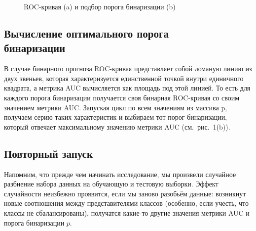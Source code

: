 \begin{figure}[!htb]
\begin{minipage}{0.32\textwidth}
	\end{minipage}
	\caption{ROC-кривая (a) и подбор порога бинаризации (b)}
\end{figure}


\subsection{Вычисление оптимального порога\\ бинаризации}

В случае бинарного прогноза ROC-кривая представляет собой ломаную линию из двух звеньев, которая характеризуется единственной точкой внутри единичного квадрата, а метрика AUC вычисляется как площадь под этой линией. То есть для каждого порога бинаризации получается своя бинарная ROC-кривая со своим значением метрики AUC. Запуская цикл по всем значениям из массива p, получаем серию таких характеристик и выбираем тот порог бинаризации, который отвечает максимальному значению метрики AUC (см. рис.~1(b)).

\subsection{Повторный запуск}
Напомним, что прежде чем начинать исследование, мы произвели случайное разбиение набора данных на обучающую и тестовую выборки. Эффект случайности неизбежно проявится, если мы заново разобьём данные: возникнут новые соотношения между представителями классов (особенно, если учесть, что классы не сбалансированы), получатся какие-то другие значения метрики AUC и порога бинаризации $p$. 

